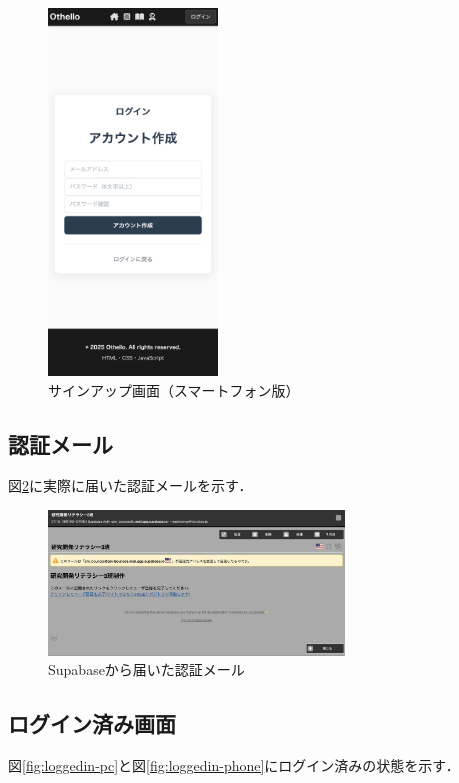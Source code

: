 \documentclass[10pt, a4paper]{jsarticle}
\begin{document}
\begin{figure}[H]
\centering
\includegraphics[width=0.4\textwidth]{img/signup-phone.png}
\caption{サインアップ画面（スマートフォン版）}
\label{fig:signup-phone}
\end{figure}

\subsection{認証メール}
図\ref{fig:mail-from-supabase}に実際に届いた認証メールを示す．

\begin{figure}[H]
\centering
\includegraphics[width=0.7\textwidth]{img/mail-from-supabase.png}
\caption{Supabaseから届いた認証メール}
\label{fig:mail-from-supabase}
\end{figure}

\subsection{ログイン済み画面}
図\ref{fig:loggedin-pc}と図\ref{fig:loggedin-phone}にログイン済みの状態を示す．
\end{document}
